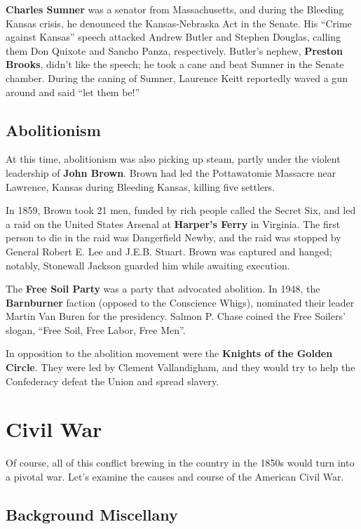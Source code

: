 \textbf{Charles Sumner} was a senator from Massachusetts,
and during the Bleeding Kansas crisis, he denounced the Kansas-Nebraska Act in the Senate.
His ``Crime against Kansas'' speech attacked Andrew Butler and Stephen Douglas,
calling them Don Quixote and Sancho Panza, respectively.
Butler's nephew, \textbf{Preston Brooks}, didn't like the speech;
he took a cane and beat Sumner in the Senate chamber.
During the caning of Sumner, Laurence Keitt reportedly waved a gun around and said ``let them be!''

\subsection*{Abolitionism}

At this time, abolitionism was also picking up steam,
partly under the violent leadership of \textbf{John Brown}.
Brown had led the Pottawatomie Massacre near Lawrence, Kansas
during Bleeding Kansas, killing five settlers.

In 1859, Brown took 21 men, funded by rich people called the Secret Six,
and led a raid on the United States Arsenal at \textbf{Harper's Ferry} in Virginia.
The first person to die in the raid was Dangerfield Newby,
and the raid was stopped by General Robert E. Lee and J.E.B. Stuart.
Brown was captured and hanged;
notably, Stonewall Jackson guarded him while awaiting execution.

The \textbf{Free Soil Party} was a party that advocated abolition.
In 1948, the \textbf{Barnburner} faction (opposed to the Conscience Whigs),
nominated their leader Martin Van Buren for the presidency.
Salmon P. Chase coined the Free Soilers' slogan, ``Free Soil, Free Labor, Free Men''.

In opposition to the abolition movement were the \textbf{Knights of the Golden Circle}.
They were led by Clement Vallandigham, and they would try to help the Confederacy defeat the Union
and spread slavery.

\section{Civil War}

Of course, all of this conflict brewing in the country in the 1850s would turn into a pivotal war.
Let's examine the causes and course of the American Civil War.

\subsection*{Background Miscellany}


